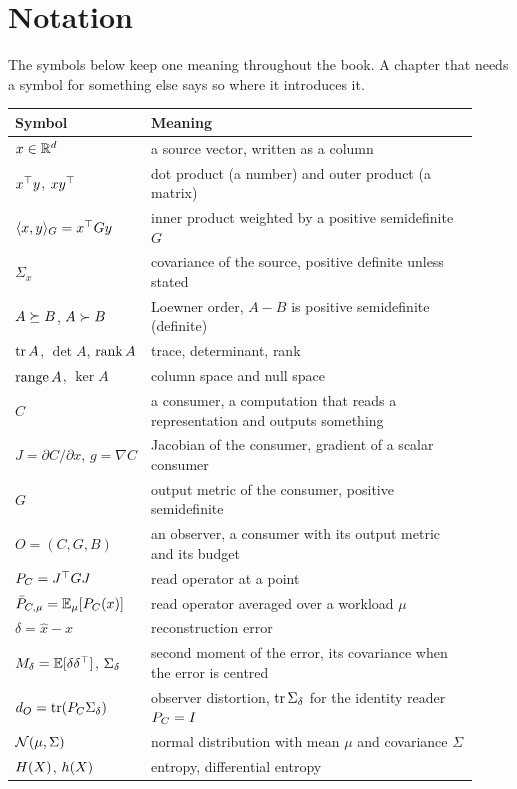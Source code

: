 \chapter{Notation}\label{appA}

The symbols below keep one meaning throughout the book. A chapter that needs a symbol for something else says so where it introduces it.

\begin{center}
\small
\begin{tabular}{@{}p{0.27\linewidth}p{0.65\linewidth}@{}}
\toprule
Symbol & Meaning \\
\midrule
$x\in\mathbb{R}^d$ & a source vector, written as a column \\
$x^{\top} y$, $xy^{\top}$ & dot product (a number) and outer product (a matrix) \\
$\langle x,y\rangle_G=x^{\top} G y$ & inner product weighted by a positive semidefinite $G$ \\
$\Sigma_x$ & covariance of the source, positive definite unless stated \\
$A\succeq B$, $A\succ B$ & Loewner order, $A-B$ is positive semidefinite (definite) \\
$\operatorname{tr} A$, $\det A$, $\operatorname{rank} A$ & trace, determinant, rank \\
$\operatorname{range} A$, $\ker A$ & column space and null space \\
$C$ & a consumer, a computation that reads a representation and outputs something \\
$J=\partial C/\partial x$, $g=\nabla C$ & Jacobian of the consumer, gradient of a scalar consumer \\
$G$ & output metric of the consumer, positive semidefinite \\
$O=(C,G,B)$ & an observer, a consumer with its output metric and its budget \\
$P_C=J^{\top} G J$ & read operator at a point \\
$\bar P_{C,\mu}=\mathbb{E}_\mu[P_C(x)]$ & read operator averaged over a workload $\mu$ \\
$\delta=\hat x-x$ & reconstruction error \\
$M_\delta=\mathbb{E}[\delta\delta^{\top}]$, $\Sigma_\delta$ & second moment of the error, its covariance when the error is centred \\
$d_O=\operatorname{tr}(P_C\Sigma_\delta)$ & observer distortion, $\operatorname{tr}\Sigma_\delta$ for the identity reader $P_C=I$ \\
$\mathcal{N}(\mu,\Sigma)$ & normal distribution with mean $\mu$ and covariance $\Sigma$ \\
$H(X)$, $h(X)$ & entropy, differential entropy \\

\end{tabular}
\end{center}
